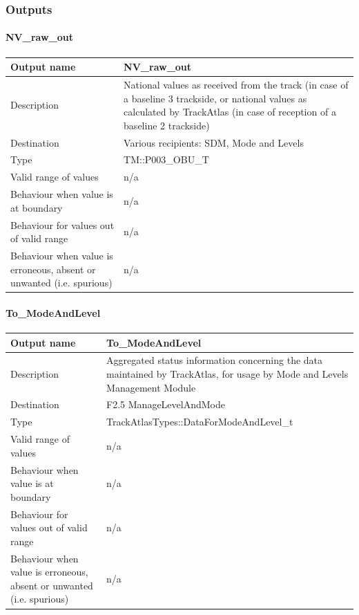 \subsubsection{Outputs}\label{s:manage_track_data_outputs}

\paragraph{NV\_raw\_out}

\begin{longtable}{p{}p{}}
\toprule
Output name				& NV\_raw\_out \\
\midrule
Description				& National values as received from the track (in case of a baseline 3 trackside, or national values as calculated by TrackAtlas (in case of reception of a baseline 2 trackside) \\
\midrule
Destination				& Various recipients: SDM, Mode and Levels\\ 
\midrule
Type					& TM::P003\_OBU\_T \\
\midrule
Valid range of values	& n/a \\
\midrule
Behaviour when value is at boundary	& n/a  \\
\midrule
Behaviour for values out of valid range	& n/a  \\
\midrule
Behaviour when value is erroneous, absent or unwanted (i.e. spurious) & n/a  \\
\bottomrule
\end{longtable}


\paragraph{To\_ModeAndLevel}

\begin{longtable}{p{}p{}}
\toprule
Output name				& To\_ModeAndLevel \\
\midrule
Description				& Aggregated status information concerning the data maintained by TrackAtlas, for usage by Mode and Levels Management Module \\
\midrule
Destination				& F2.5 ManageLevelAndMode \\ 
\midrule
Type					& TrackAtlasTypes::DataForModeAndLevel\_t\\
\midrule
Valid range of values	& n/a \\
\midrule
Behaviour when value is at boundary	& n/a  \\
\midrule
Behaviour for values out of valid range	& n/a  \\
\midrule
Behaviour when value is erroneous, absent or unwanted (i.e. spurious) & n/a  \\
\bottomrule
\end{longtable}

